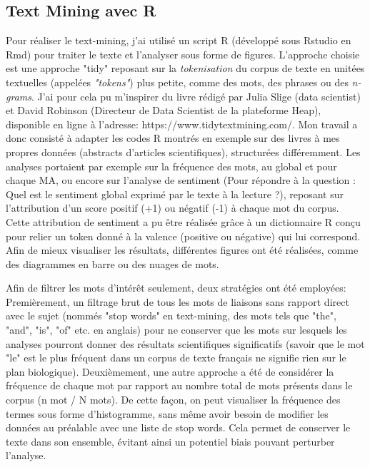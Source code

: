 \documentclass{book}
\begin{document}
\subsection{Text Mining avec R}
\noindent
Pour réaliser le text-mining, j'ai utilisé un script R (développé sous Rstudio
en Rmd) pour traiter le texte et l'analyser sous forme de figures. L'approche
choisie est une approche "tidy" reposant sur la \textit{tokenisation} du corpus
de texte en unitées textuelles (appelées \textit{"tokens"}) plus petite, comme
des mots, des phrases ou des \textit{n-grams}. J'ai pour cela pu m'inspirer du
livre rédigé par Julia Slige (data scientist) et David Robinson (Directeur de
Data Scientist de la plateforme Heap), disponible en ligne à l'adresse:
https://www.tidytextmining.com/. Mon travail a donc consisté à adapter les
codes R montrés en exemple sur des livres à mes propres données (abstracts
d'articles scientifiques), structurées différemment. Les analyses portaient par
exemple sur la fréquence des mots, au global et pour chaque MA, ou encore sur
l'analyse de sentiment (Pour répondre à la question : Quel est le sentiment
global exprimé par le texte à la lecture ?), reposant sur l'attribution d'un
score positif (+1) ou négatif (-1) à chaque mot du corpus. Cette attribution de
sentiment a pu être réalisée grâce à un dictionnaire R conçu pour relier un
token donné à la valence (positive ou négative) qui lui correspond. Afin de
mieux visualiser les résultats, différentes figures ont été réalisées, comme
des diagrammes en barre ou des nuages de mots.

Afin de filtrer les mots d'intérêt seulement, deux stratégies ont été
employées: Premièrement, un filtrage brut de tous les mots de liaisons sans
rapport direct avec le sujet (nommés "stop words" en text-mining, des mots tels
que "the", "and", "is", "of" etc. en anglais) pour ne conserver que les mots
sur lesquels les analyses pourront donner des résultats scientifiques
significatifs (savoir que le mot "le" est le plus fréquent dans un corpus de
texte français ne signifie rien sur le plan biologique). Deuxièmement, une
autre approche a été de considérer la fréquence de chaque mot par rapport au
nombre total de mots présents dans le corpus (n mot / N mots). De cette façon,
on peut visualiser la fréquence des termes sous forme d'histogramme, sans même
avoir besoin de modifier les données au préalable avec une liste de stop words.
Cela permet de conserver le texte dans son ensemble, évitant ainsi un potentiel
biais pouvant perturber l'analyse.
\end{document}
